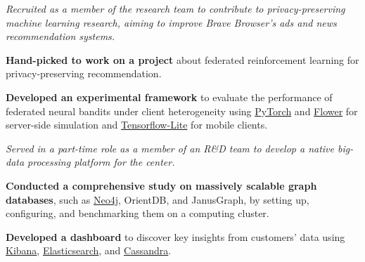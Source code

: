 \documentclass[11pt]{article}
\begin{document}
\textit{Recruited as a member of the research team to contribute to privacy-preserving machine learning research, aiming to improve Brave Browser's ads and news recommendation systems.}
  \begin{innerlist}
    \item \textbf{Hand-picked to work on a project} about federated reinforcement learning for privacy-preserving recommendation.
    \item \textbf{Developed an experimental framework} to evaluate the performance of federated neural bandits under client heterogeneity using \href{https://pytorch.org/}{PyTorch} and \href{https://flower.dev/}{Flower} for server-side simulation and \href{https://www.tensorflow.org/lite}{Tensorflow-Lite} for mobile clients.
  \end{innerlist}

\textit{Served in a part-time role as a member of an R\&D team to develop a native big-data processing platform for the center.}
  \begin{innerlist}
    \item \textbf{Conducted a comprehensive study on massively scalable graph databases}, such as \href{https://neo4j.com/}{Neo4j}, OrientDB, and JanusGraph, by setting up, configuring, and benchmarking them on a computing cluster.
    \item \textbf{Developed a dashboard} to discover key insights from customers' data using \href{https://www.elastic.co/kibana}{Kibana}, \href{https://www.elastic.co/elasticsearch/}{Elasticsearch}, and \href{https://cassandra.apache.org/}{Cassandra}.
  \end{innerlist}
\end{document}
